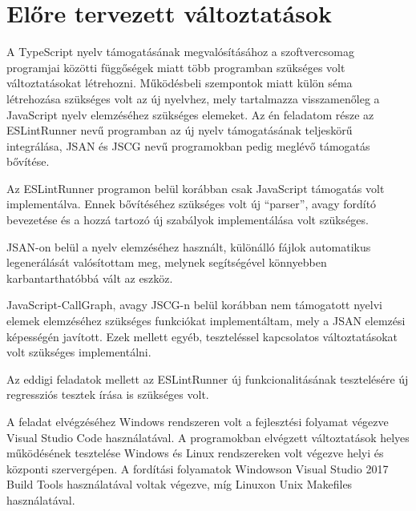 \chapter{Előre tervezett változtatások}
\label{chap:fejezet3}


A TypeScript nyelv támogatásának megvalósításához a szoftvercsomag programjai közötti függőségek miatt több programban szükséges volt változtatásokat létrehozni.
Működésbeli szempontok miatt külön séma létrehozása szükséges volt az új nyelvhez, mely tartalmazza visszamenőleg a JavaScript nyelv elemzéséhez szükséges elemeket.
Az én feladatom része az ESLintRunner nevű programban az új nyelv támogatásának teljeskörű integrálása, JSAN és JSCG nevű programokban pedig meglévő támogatás bővítése.

Az ESLintRunner programon belül korábban csak JavaScript támogatás volt implementálva. Ennek bővítéséhez szükséges volt új ``parser'', avagy fordító bevezetése és a hozzá tartozó új szabályok implementálása volt szükséges.

JSAN-on belül a nyelv elemzéséhez használt, különálló fájlok automatikus legenerálását valósítottam meg, melynek segítségével könnyebben karbantarthatóbbá vált az eszköz.

JavaScript-CallGraph, avagy JSCG-n belül korábban nem támogatott nyelvi elemek elemzéséhez szükséges funkciókat implementáltam, mely a JSAN elemzési képességén javított.
Ezek mellett egyéb, teszteléssel kapcsolatos változtatásokat volt szükséges implementálni.

Az eddigi feladatok mellett az ESLintRunner új funkcionalitásának tesztelésére új regressziós tesztek írása is szükséges volt.

A feladat elvégzéséhez Windows rendszeren volt a fejlesztési folyamat végezve Visual Studio Code használatával. A programokban elvégzett változtatások helyes működésének tesztelése Windows és Linux rendszereken volt végezve helyi és központi szervergépen. A fordítási folyamatok Windowson Visual Studio 2017 Build Tools használatával voltak végezve, míg Linuxon Unix Makefiles használatával.